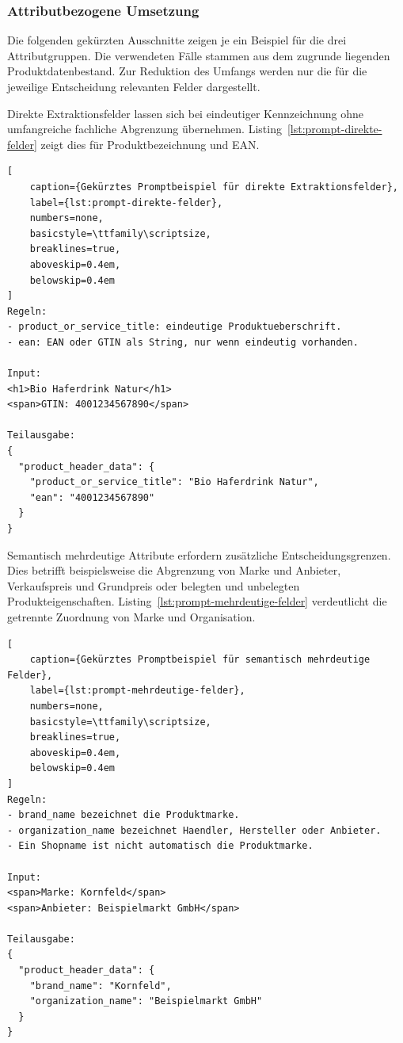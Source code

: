 \subsubsection{Attributbezogene Umsetzung}

Die folgenden gekürzten Ausschnitte zeigen je ein Beispiel für die drei Attributgruppen. Die verwendeten Fälle stammen aus dem zugrunde liegenden Produktdatenbestand. Zur 
Reduktion des Umfangs werden nur die für die jeweilige Entscheidung relevanten Felder dargestellt.

Direkte Extraktionsfelder lassen sich bei eindeutiger Kennzeichnung ohne umfangreiche fachliche Abgrenzung übernehmen. Listing~\ref{lst:prompt-direkte-felder} zeigt dies 
für Produktbezeichnung und EAN.

\begin{lstlisting}[
    caption={Gekürztes Promptbeispiel für direkte Extraktionsfelder},
    label={lst:prompt-direkte-felder},
    numbers=none,
    basicstyle=\ttfamily\scriptsize,
    breaklines=true,
    aboveskip=0.4em,
    belowskip=0.4em
]
Regeln:
- product_or_service_title: eindeutige Produktueberschrift.
- ean: EAN oder GTIN als String, nur wenn eindeutig vorhanden.

Input:
<h1>Bio Haferdrink Natur</h1>
<span>GTIN: 4001234567890</span>

Teilausgabe:
{
  "product_header_data": {
    "product_or_service_title": "Bio Haferdrink Natur",
    "ean": "4001234567890"
  }
}
\end{lstlisting}

Semantisch mehrdeutige Attribute erfordern zusätzliche Entscheidungsgrenzen. Dies betrifft beispielsweise die Abgrenzung von Marke und Anbieter, Verkaufspreis und 
Grundpreis oder belegten und unbelegten Produkteigenschaften. Listing~\ref{lst:prompt-mehrdeutige-felder} verdeutlicht die getrennte Zuordnung von Marke und Organisation.

\begin{lstlisting}[
    caption={Gekürztes Promptbeispiel für semantisch mehrdeutige Felder},
    label={lst:prompt-mehrdeutige-felder},
    numbers=none,
    basicstyle=\ttfamily\scriptsize,
    breaklines=true,
    aboveskip=0.4em,
    belowskip=0.4em
]
Regeln:
- brand_name bezeichnet die Produktmarke.
- organization_name bezeichnet Haendler, Hersteller oder Anbieter.
- Ein Shopname ist nicht automatisch die Produktmarke.

Input:
<span>Marke: Kornfeld</span>
<span>Anbieter: Beispielmarkt GmbH</span>

Teilausgabe:
{
  "product_header_data": {
    "brand_name": "Kornfeld",
    "organization_name": "Beispielmarkt GmbH"
  }
}
\end{lstlisting}

